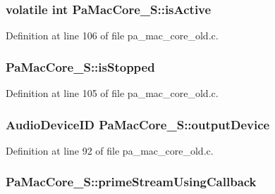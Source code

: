 \subsubsection[{\texorpdfstring{is\+Active}{isActive}}]{\setlength{\rightskip}{0pt plus 5cm}volatile {\bf int} Pa\+Mac\+Core\+\_\+\+S\+::is\+Active}\hypertarget{struct_pa_mac_core___s_a899bd0773fde0676745ed3aeb3740909}{}\label{struct_pa_mac_core___s_a899bd0773fde0676745ed3aeb3740909}


Definition at line 106 of file pa\+\_\+mac\+\_\+core\+\_\+old.\+c.

\subsubsection[{\texorpdfstring{is\+Stopped}{isStopped}}]{ Pa\+Mac\+Core\+\_\+\+S\+::is\+Stopped}\hypertarget{struct_pa_mac_core___s_a10e111b013ef34840e71760dbdf5deb7}{}\label{struct_pa_mac_core___s_a10e111b013ef34840e71760dbdf5deb7}


Definition at line 105 of file pa\+\_\+mac\+\_\+core\+\_\+old.\+c.

\subsubsection[{\texorpdfstring{output\+Device}{outputDevice}}]{\setlength{\rightskip}{0pt plus 5cm}Audio\+Device\+ID Pa\+Mac\+Core\+\_\+\+S\+::output\+Device}\hypertarget{struct_pa_mac_core___s_a5e1d26bac1e0d45210b634fbbd5bb9f6}{}\label{struct_pa_mac_core___s_a5e1d26bac1e0d45210b634fbbd5bb9f6}


Definition at line 92 of file pa\+\_\+mac\+\_\+core\+\_\+old.\+c.

\subsubsection[{\texorpdfstring{prime\+Stream\+Using\+Callback}{primeStreamUsingCallback}}]{ Pa\+Mac\+Core\+\_\+\+S\+::prime\+Stream\+Using\+Callback}\hypertarget{struct_pa_mac_core___s_a9550018299a5cae953fb6e4c5b5eaefd}{}\label{struct_pa_mac_core___s_a9550018299a5cae953fb6e4c5b5eaefd}


